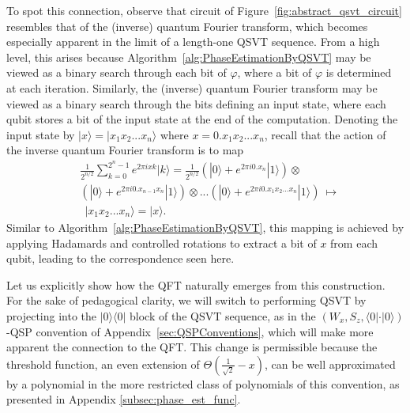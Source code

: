 \documentclass[aps,pra,showpacs,notitlepage,twocolumn,superscriptaddress,nofootinbib]{revtex4-1}
\begin{document}
    
    To spot this connection, observe that circuit of Figure~\ref{fig:abstract_qsvt_circuit} resembles that of the (inverse) quantum Fourier transform, which becomes especially apparent in the limit of a length-one QSVT sequence. From a high level, this arises because Algorithm~\ref{alg:PhaseEstimationByQSVT} may be viewed as a binary search through each bit of $\varphi$, where a bit of $\varphi$ is determined at each iteration. Similarly, the (inverse) quantum Fourier transform may be viewed as a binary search through the bits defining an input state, where each qubit stores a bit of the input state at the end of the computation. Denoting the input state by $|x\rangle = |x_1 x_2 ... x_n\rangle$ where $x=0.x_1x_2 ... x_n$, recall that the action of the inverse quantum Fourier transform is to map 
    \begin{equation}
    \begin{split}
        &\frac{1}{2^{n/2}} \sum_{k=0}^{2^n-1} e^{2\pi i xk}|k\rangle = \frac{1}{2^{n/2}} \left(|0\rangle + e^{2\pi i 0.x_n} |1\rangle\right)\otimes \\ 
        &\left(|0\rangle + e^{2\pi i 0.x_{n-1}x_n} |1\rangle \right) \otimes...\left(|0\rangle + e^{2\pi i 0.x_1 x_2 ...x_n }|1\rangle \right) \ \mapsto \\ & \ \ |x_1 x_2 ... x_n\rangle = |x\rangle. 
    \end{split}
    \end{equation}
    Similar to Algorithm~\ref{alg:PhaseEstimationByQSVT}, this mapping is achieved by applying Hadamards and controlled rotations to extract a bit of $x$ from each qubit, leading to the correspondence seen here.
    
    
    Let us explicitly show how the QFT naturally emerges from this construction. For the sake of pedagogical clarity, we will switch to performing QSVT by projecting into the $|0\rangle \langle 0|$ block of the QSVT sequence, as in the $(W_x,S_z,\langle 0| \cdot |0\rangle)$-QSP convention of Appendix~\ref{sec:QSPConventions}, which will make more apparent the connection to the QFT. This change is permissible because the threshold function, an even extension of $\Theta\left( \frac{1}{\sqrt{2}}-x \right)$, can be well approximated by a polynomial in the more restricted class of polynomials of this convention, as presented in Appendix \ref{subsec:phase_est_func}. 
    
\end{document}
